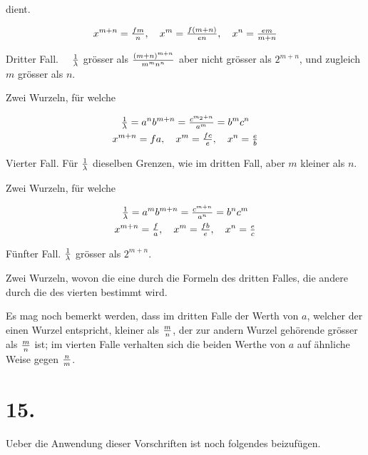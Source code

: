 \documentclass[twoside,12pt, showframe]{memoir}
\let\oldfrac\frac
\def\frac#1#2{\mathchoice{\tfrac{#1}{#2}}{\oldfrac{#1}{#2}}{\genfrac{}{}{}{2}{#1}{#2\mathstrut}}{\genfrac{}{}{}{3}{#1}{#2\mathstrut}}}
\begin{document}
dient.

\[
x^{m+n}=\frac{f m}{n}, \quad x^{m}=\frac{f(m+n)}{e n}, \quad x^{n}=\frac{e m}{m+n}
\]

Dritter Fall. \(\quad \frac{1}{\lambda}\) grösser als \(\frac{(m+n)^{m+n}}{m^{m} n^{n}}\) aber nicht grösser als \(2^{m+n}\), und zugleich \(m\) grösser als \(n\).

Zwei Wurzeln, für welche

\[
\begin{gathered}
\frac{1}{\lambda}=a^{n} b^{m+n}=\frac{c^{m_{2}+n}}{a^{m}}=b^{m} c^{n} \\
x^{m+n}=f a, \quad x^{m}=\frac{f c}{e}, \quad x^{n}=\frac{e}{b}
\end{gathered}
\]

Vierter Fall. Für \(\frac{1}{\lambda}\) dieselben Grenzen, wie im dritten Fall, aber \(m\) kleiner als \(n\).

Zwei Wurzeln, für welche

\[
\begin{gathered}
\frac{1}{\lambda}=a^{m} b^{m+n}=\frac{c^{m+n}}{a^{n}}=b^{n} c^{m} \\
x^{m+n}=\frac{f}{a}, \quad x^{m}=\frac{f b}{e}, \quad x^{n}=\frac{e}{c}
\end{gathered}
\]

Fünfter Fall. \(\frac{1}{\lambda}\) grösser als \(2^{m+n}\).

Zwei Wurzeln, wovon die eine durch die Formeln des dritten Falles, die andere durch die des vierten bestimmt wird.

Es mag noch bemerkt werden, dass im dritten Falle der Werth von \(a\), welcher der einen Wurzel entspricht, kleiner als \(\frac{m}{n}\), der zur andern Wurzel gehörende grösser als \(\frac{m}{n}\) ist; im vierten Falle verhalten sich die beiden Werthe von \(a\) auf ähnliche Weise gegen \(\frac{n}{m}\).

\section*{15.}
Ueber die Anwendung dieser Vorschriften ist noch folgendes beizufügen.
\end{document}
